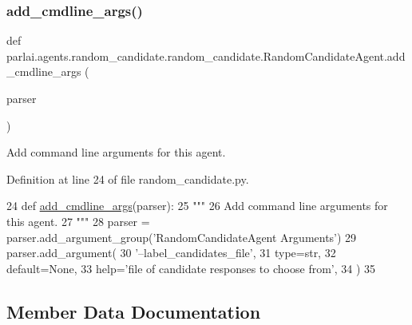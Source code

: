 \subsubsection{\texorpdfstring{add\+\_\+cmdline\+\_\+args()}{add\_cmdline\_args()}}
{\footnotesize\ttfamily def parlai.\+agents.\+random\+\_\+candidate.\+random\+\_\+candidate.\+Random\+Candidate\+Agent.\+add\+\_\+cmdline\+\_\+args (\begin{DoxyParamCaption}\item[{}]{parser }\end{DoxyParamCaption})\hspace{0.3cm}{\ttfamily [static]}}

\begin{DoxyVerb}Add command line arguments for this agent.
\end{DoxyVerb}
 

Definition at line 24 of file random\+\_\+candidate.\+py.


\begin{DoxyCode}
24     \textcolor{keyword}{def }\hyperlink{namespaceparlai_1_1agents_1_1drqa_1_1config_a62fdd5554f1da6be0cba185271058320}{add\_cmdline\_args}(parser):
25         \textcolor{stringliteral}{"""}
26 \textcolor{stringliteral}{        Add command line arguments for this agent.}
27 \textcolor{stringliteral}{        """}
28         parser = parser.add\_argument\_group(\textcolor{stringliteral}{'RandomCandidateAgent Arguments'})
29         parser.add\_argument(
30             \textcolor{stringliteral}{'--label\_candidates\_file'},
31             type=str,
32             default=\textcolor{keywordtype}{None},
33             help=\textcolor{stringliteral}{'file of candidate responses to choose from'},
34         )
35 
\end{DoxyCode}


\subsection{Member Data Documentation}
\mbox{\label{classparlai_1_1agents_1_1random__candidate_1_1random__candidate_1_1RandomCandidateAgent_adc2ff06b9b7e9463dc00dfa227fdc7d6}} 
